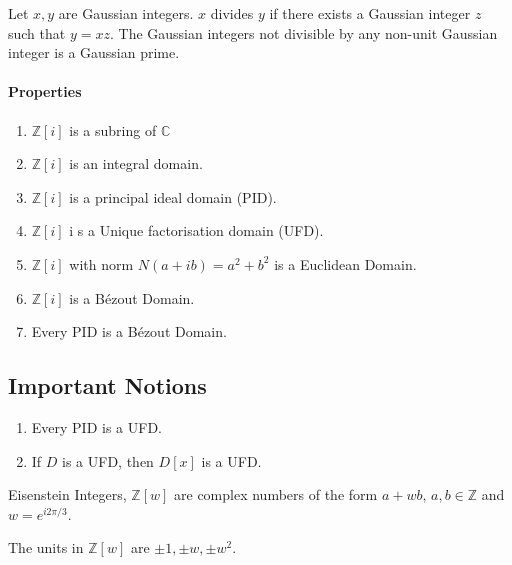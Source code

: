 	Let $x,y$ are Gaussian integers. $x$ divides $y$ if there exists a Gaussian integer $z$ such that $y = xz$.
	The Gaussian integers not divisible by any non-unit Gaussian integer is a Gaussian prime.
\paragraph{Properties}
	\begin{enumerate}
		\item $\mathbb{Z}[i]$ is a subring of $\mathbb{C}$
		\item $\mathbb{Z}[i]$ is an integral domain.
		\item $\mathbb{Z}[i]$ is a principal ideal domain (PID).
		\item $\mathbb{Z}[i]$ i s a Unique factorisation domain (UFD).
		\item $\mathbb{Z}[i]$ with norm $N(a+ib) = a^2+b^2$ is a Euclidean Domain.
		\item $\mathbb{Z}[i]$ is a B\'ezout Domain.
		\item Every PID is a B\'ezout Domain.
	\end{enumerate}

\subsection*{Important Notions}
\begin{enumerate}
	\item Every PID is a UFD.
	\item If $D$ is a UFD, then $D[x]$ is a UFD.
\end{enumerate}

\begin{definition}
	Eisenstein Integers, $\mathbb{Z}[w]$ are complex numbers of the form $a+wb$, $a,b \in \mathbb{Z}$ and $w = e^{i2\pi/3}$.
\end{definition}
	The units in $\mathbb{Z}[w]$ are $\pm 1, \pm w, \pm w^2$.
